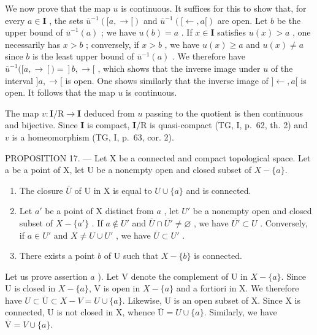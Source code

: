 We now prove that the map \(u\) is continuous. It suffices for this to show that, for every \(a \in \mathbf{I}\) , the sets \(\overline{u}^{-1}([a, \to[)\) and \(\overline{u}^{-1}([\leftarrow, a[)\) are open. Let \(b\) be the upper bound of \(\overline{u}^{-1}(a)\) ; we have \(u(b) = a\) . If \(x \in \mathbf{I}\) satisfies \(u(x) > a\) , one necessarily has \(x > b\) ; conversely, if \(x > b\) , we have \(u(x) \geqslant a\) and \(u(x) \neq a\) since \(b\) is the least upper bound of \(\overline{u}^{-1}(a)\) . We therefore have \(\overline{u}^{-1}([a, \to[) = ]b, \to[\) , which shows that the inverse image under \(u\) of the interval \(]a, \to[\) is open. One shows similarly that the inverse image of \(]\leftarrow, a[\) is open. It follows that the map \(u\) is continuous.

The map \(v \colon \mathbf{I} / \mathrm{R} \to \mathbf{I}\) deduced from \(u\) passing to the quotient is then continuous and bijective. Since \(\mathbf{I}\) is compact, \(\mathbf{I} / \mathrm{R}\) is quasi-compact (TG, I, p.~62, th. 2) and \(v\) is a homeomorphism (TG, I, p.~63, cor. 2).

PROPOSITION 17. --- Let X be a connected and compact topological space. Let a be a point of X, let U be a nonempty open and closed subset of \(X - \{a\}\).

\begin{enumerate}
\def\labelenumi{\alph{enumi})}
\item
  The closure \(\overline{U}\) of U in X is equal to \(U \cup \{a\}\) and is connected.
\item
  Let \(a'\) be a point of X distinct from \(a\) , let \(U'\) be a nonempty open and closed subset of \(X - \{a'\}\) . If \(a \notin U'\) and \(\overline{U} \cap \overline{U'} \neq \varnothing\) , we have \(\overline{U'} \subset U\) . Conversely, if \(a \in U'\) and \(X \neq U \cup U'\) , we have \(\overline{U} \subset U'\) .
\item
  There exists a point \(b\) of U such that \(X - \{b\}\) is connected.
\end{enumerate}

Let us prove assertion \(a\) ). Let V denote the complement of U in \(X - \{a\}\). Since U is closed in \(X - \{a\}\), V is open in \(X - \{a\}\) and a fortiori in X. We therefore have \(U \subset \overline{\mathrm{U}} \subset X - V = U \cup \{a\}\). Likewise, U is an open subset of X. Since X is connected, U is not closed in X, whence \(\overline{\mathrm{U}} = U \cup \{a\}\). Similarly, we have \(\overline{\mathrm{V}} = V \cup \{a\}\).

